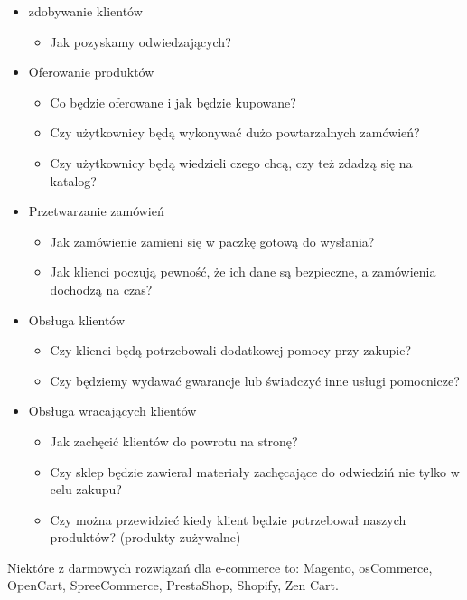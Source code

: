 \documentclass{article}
\begin{document}
\begin{itemize}
\item zdobywanie klientów
\begin{itemize}
\item Jak pozyskamy odwiedzających?
\end{itemize}
\item Oferowanie produktów
\begin{itemize}
\item Co będzie oferowane i jak będzie kupowane?
\item Czy użytkownicy będą wykonywać dużo powtarzalnych zamówień?
\item Czy użytkownicy będą wiedzieli czego chcą, czy też zdadzą się na katalog?
\end{itemize}
\item Przetwarzanie zamówień
\begin{itemize}
\item Jak zamówienie zamieni się w paczkę gotową do wysłania?
\item Jak klienci poczują pewność, że ich dane są bezpieczne, a zamówienia dochodzą na czas?
\end{itemize}
\item Obsługa klientów
\begin{itemize}
\item Czy klienci będą potrzebowali dodatkowej pomocy przy zakupie?
\item Czy będziemy wydawać gwarancje lub świadczyć inne usługi pomocnicze?
\end{itemize}
\item Obsługa wracających klientów
\begin{itemize}
\item Jak zachęcić klientów do powrotu na stronę?
\item Czy sklep będzie zawierał materiały zachęcające do odwiedziń nie tylko w celu zakupu?
\item Czy można przewidzieć kiedy klient będzie potrzebował naszych produktów? (produkty zużywalne)
\end{itemize}
\end{itemize}
Niektóre z darmowych rozwiązań dla e-commerce to: Magento, osCommerce, OpenCart, SpreeCommerce, PrestaShop, Shopify, Zen Cart.
\end{document}
